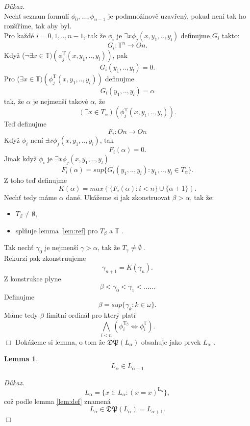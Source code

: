 \documentclass[12pt,a4paper]{article}
\newtheorem{lemma}[veta]{Lemma}
\newenvironment{proof}
{\noindent \textit{D\r{u}kaz.}}
{\hspace*{\fill} $\Box$}
\begin{document}
\begin{proof}
~\\
Nech\v{t} seznam formul\'{i} $ \phi_0,...,\phi_{n-1}  $ je podmno\v{z}inov\v{e} uzav\v{r}en\'{y}, pokud nen\'{i} tak ho roz\v{s}\'{i}\v{r}\'{i}me, tak aby byl.\\
Pro ka\v{z}d\'{e} $ i=0,1,..,n-1 $, tak \v{z}e $ \phi_i $ je $ \exists x \phi_j(x,y_1,..,y_l) $ definujme $ G_i $ takto:
\[ G_i:\mathbb{T}^n \rightarrow \textit{On} .\]
Kdy\v{z}  ($ \neg \exists x \in \mathbb{T}) (\phi_j^\mathrm{T}(x,y_1,..,y_l))  $, pak
\[ G_i(y_1,..,y_l)=0 . \]
Pro ($ \exists x \in \mathbb{T}) (\phi_j^\mathrm{T}(x,y_1,..,y_l)) $ definujme
\[ G_i(y_1,..,y_l)=\alpha \]
tak, \v{z}e $ \alpha $ je nejmen\v{s}\'{i} takov\'{e} $ \alpha $, \v{z}e  
\[  (\exists x \in {T_\alpha})(  \phi_j^\mathrm{T}(x,y_1,..,y_l)). \]
Te\v{d} definujme 
\[ F_i:\textit{On}  \rightarrow \textit{On} \]
Kdy\v{z} $ \phi_i $ nen\'{i} $ \exists x \phi_j(x,y_1,..,y_l)$, tak
\[ F_i(\alpha)=0 .\]
Jinak kdy\v{z} $ \phi_i $ je $ \exists x \phi_j(x,y_1,..,y_l)$
\[ F_i(\alpha)=sup\{ G_i(y_1,..,y_l):y_1,..,y_l \in T_\alpha \}.\]
Z toho te\v{d} definujme
\[ K (\alpha)=max( \{F_i(\alpha): i < n\} \cup \{\alpha + 1\}) .\]
Nech\v{t} tedy m\'{a}me $ \alpha $ dan\'{e}. Uk\'{a}\v{z}eme si jak zkonstruovat $ \beta > \alpha $, tak \v{z}e:
\begin{itemize}
  \item $ T_\beta \neq \emptyset  $,
 \item spl\v{n}uje lemma \ref{lem:ref} pro $ T_\beta $ a $ \mathbb{T} $ .
 \end{itemize}
Tak nech\v{t} $ \gamma_0 $ je nejmen\v{s}\'{i} $ \gamma > \alpha $, tak \v{z}e $ T_\gamma \neq \emptyset   $ .\\
 Rekurz\'{i} pak zkonstruujeme
\[  \gamma_{n+1}=K(\gamma_n) .\]
Z konstrukce plyne
\[ \beta < \gamma_0 < \gamma_1 < ..... .\]
Definujme 
\[ \beta=sup\{\gamma_k: k \in \omega \} .\]
M\'{a}me tedy $ \beta $  limitn\'{i} ordin\'{a}l pro kter\'{y} plat\'{i}
 \[ \bigwedge_{i<n}(\phi_{i}^\mathrm{T_\beta} \Leftrightarrow \phi_{i}^\mathbb{T})  .\]
\end{proof}
\newpage
Dok\'{a}\v{z}eme si lemma, o tom \v{z}e $ \mathfrak{DP}(L_\alpha)$  obsahuje jako prvek $ L_\alpha$ .
\begin{lemma}
\label{lem:prv}
\[ L_\alpha \in L_{\alpha +1} \]
\end{lemma}
\begin{proof}
\[ L_\alpha=\{x \in L_\alpha: (x=x)^\mathrm{L_\alpha}\} , \]
co\v{z} podle lemma \ref{lem:def} znamen\'{a}
\[ L_\alpha \in \mathfrak{DP}(L_\alpha) = L_{\alpha +1} .\]
\end{proof}~\\
\end{document}
